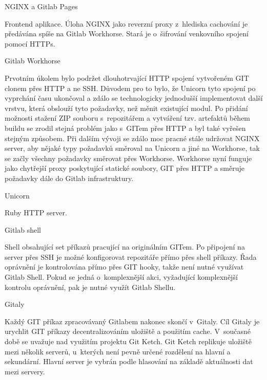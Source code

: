 \secc NGINX a Gitlab Pages

Frontend aplikace. Úloha NGINX jako reverzní proxy z~hlediska cachování je předávána spíše na Gitlab Workhorse.
Stará je o~šifrování venkovního spojení pomocí HTTPs.

\secc Gitlab Workhorse

Prvotním úkolem bylo podržet dlouhotrvající HTTP spojení vytvořeném GIT clonem přes HTTP a ne SSH.
Důvodem pro to bylo, že Unicorn tyto spojení po vyprchání času ukončoval a zdálo se technologicky jednodušší implementovat další vrstvu, která obslouží tyto požadavky, než měnit existující modul.
Po přidání možnosti stažení ZIP souboru s~repozitářem a vytváření tzv. artefaktů během buildu se zrodil stejná problém jako s~GITem přes HTTP a byl také vyřešen stejným způsobem.
Při dalším vývoji se zdálo moc pracné stále udržovat NGINX server, aby nějaké typy požadavků směroval na Unicorn a jiné na Workhorse, tak se začly všechny požadavky směrovat přes Workhorse.
Workhorse nyní funguje jako chytřejší proxy poskytující statické soubory, GIT přes HTTP a směruje požadavky dále do Gitlab infrastruktury.


\secc Unicorn

Ruby HTTP server.


\secc Gitlab shell

Shell obsahující set příkazů pracující na originálním GITem.
Po připojení na server přes SSH je možné konfigorovat repozitáře přímo přes shell příkazy.
Řada oprávnění je kontrolována přímo přes GIT hooky, takže není nutné využívat Gitlab Shell.
Pokud se jedná o~komplexnější akci, vyžadující komplexnější kontrolu oprávnění, pak je nutné využít Gitlab Shellu.


\secc Gitaly

Každý GIT příkaz zpracovávaný Gitlabem nakonec skončí v~Gitaly.
Cíl Gitaly je urychlit GIT příkazy decentralizováním uložiště a použitím cache.
V~současné době se uvažuje nad využitím projektu Git Ketch.
Git Ketch replikuje uložiště mezi několik serverů, u~kterých není pevně určené rozdělení na hlavní a sekundární.
Hlavní server je vybrán podle hlasování na základě aktuálnosti dat mezi servery.



